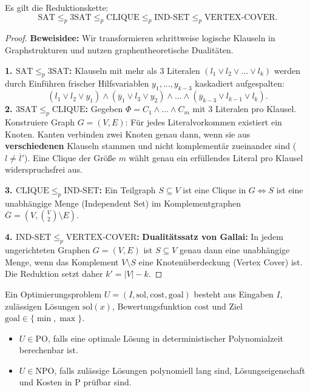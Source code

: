 \begin{theorem}
    Es gilt die Reduktionskette:
    \[
        \mathrm{SAT} \le_p \mathrm{3SAT} \le_p \mathrm{CLIQUE} \le_p \mathrm{IND\text{-}SET} \le_p \mathrm{VERTEX\text{-}COVER}.
    \]
\end{theorem}

\begin{proof}
    \textbf{Beweisidee:} Wir transformieren schrittweise logische Klauseln in Graphstrukturen und nutzen graphentheoretische Dualitäten.
    
    \textbf{1. $\mathrm{SAT} \le_p \mathrm{3SAT}$:} Klauseln mit mehr als 3 Literalen $(l_1 \lor l_2 \lor \dots \lor l_k)$ werden durch Einführen frischer Hilfsvariablen $y_1, \dots, y_{k-3}$ kaskadiert aufgespalten:
    \[
        (l_1 \lor l_2 \lor y_1) \land (\overline{y}_1 \lor l_3 \lor y_2) \land \dots \land (\overline{y}_{k-3} \lor l_{k-1} \lor l_k).
    \]
    \textbf{2. $\mathrm{3SAT} \le_p \mathrm{CLIQUE}$:} Gegeben $\Phi = C_1 \land \dots \land C_m$ mit 3 Literalen pro Klausel. Konstruiere Graph $G=(V, E)$: Für jedes Literalvorkommen existiert ein Knoten. Kanten verbinden zwei Knoten genau dann, wenn sie aus \textbf{verschiedenen} Klauseln stammen und nicht komplementär zueinander sind ($l \neq \overline{l}'$). Eine Clique der Größe $m$ wählt genau ein erfüllendes Literal pro Klausel widerspruchsfrei aus.
    
    \textbf{3. $\mathrm{CLIQUE} \le_p \mathrm{IND\text{-}SET}$:} Ein Teilgraph $S \subseteq V$ ist eine Clique in $G \iff S$ ist eine unabhängige Menge (Independent Set) im Komplementgraphen $\overline{G} = (V, \binom{V}{2} \setminus E)$.
    
    \textbf{4. $\mathrm{IND\text{-}SET} \le_p \mathrm{VERTEX\text{-}COVER}$:} \textbf{Dualitätssatz von Gallai:} In jedem ungerichteten Graphen $G = (V, E)$ ist $S \subseteq V$ genau dann eine unabhängige Menge, wenn das Komplement $V \setminus S$ eine Knotenüberdeckung (Vertex Cover) ist. Die Reduktion setzt daher $k' = |V| - k$.
\end{proof}

\begin{definition}
    Ein Optimierungsproblem $U = (I, \mathrm{sol}, \mathrm{cost}, \mathrm{goal})$ besteht aus Eingaben $I$, zulässigen Lösungen $\mathrm{sol}(x)$, Bewertungsfunktion $\mathrm{cost}$ und Ziel $\mathrm{goal} \in \{\min, \max\}$.
    \begin{itemize}
        \item $U \in \mathrm{PO}$, falls eine optimale Lösung in deterministischer Polynomialzeit berechenbar ist.
        \item $U \in \mathrm{NPO}$, falls zulässige Lösungen polynomiell lang sind, Lösungseigenschaft und Kosten in P prüfbar sind.
    \end{itemize}
\end{definition}

